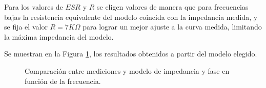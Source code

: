 Para los valores de $ESR$ y $R$ se eligen valores de manera que para frecuencias bajas la resistencia equivalente del modelo coincida con la impedancia medida, y se fija el valor $R = 7K\Omega$ para lograr un mejor ajuste a la curva medida, limitando la m\'axima impedancia del modelo.

Se muestran en la Figura \ref{fig:Comp_IND}, los resultados obtenidos a partir del modelo elegido.
\begin{figure}[H]
    \centering
    \caption{Comparaci\'on entre mediciones y modelo de impedancia y fase en funci\'on de la frecuencia. }
        \label{fig:Comp_IND}    
\end{figure}

